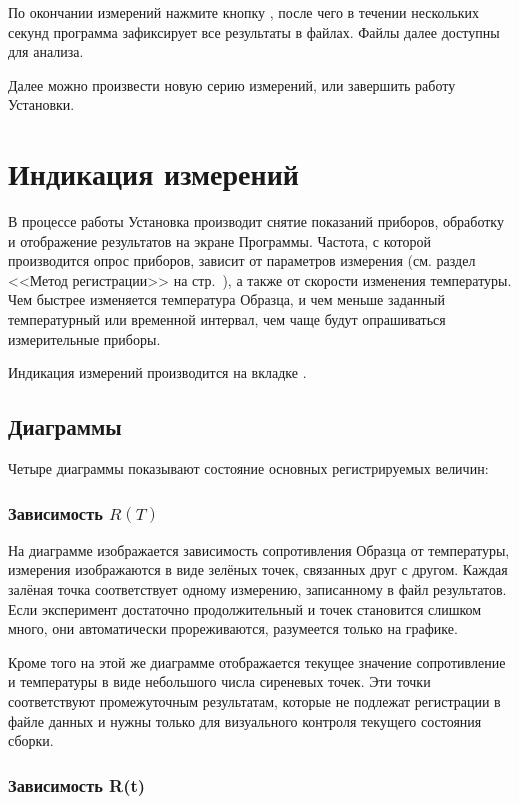 \documentclass[12pt, a4paper, twocolumn]{report}
\begin{document}
По окончании измерений нажмите кнопку , после чего в течении нескольких секунд программа зафиксирует все результаты в файлах. Файлы далее доступны для анализа.

Далее можно произвести новую серию измерений, или завершить работу Установки.

\section{Индикация измерений}

В процессе работы Установка производит снятие показаний приборов, обработку и отображение результатов на экране Программы. Частота, с которой производится опрос приборов, зависит от параметров измерения (см. раздел <<Метод регистрации>> на стр.~\pageref{sec_reg_method}), а также от скорости изменения температуры. Чем быстрее изменяется температура Образца, и чем меньше заданный температурный или временной интервал, чем чаще будут опрашиваться измерительные приборы.

Индикация измерений производится на вкладке .

\subsection{Диаграммы}

Четыре диаграммы показывают состояние основных регистрируемых величин:

\subsubsection{Зависимость $R(T)$}

На диаграмме изображается зависимость сопротивления Образца от температуры, измерения изображаются в виде зелёных точек, связанных друг с другом. Каждая залёная точка соответствует одному измерению, записанному в файл результатов. Если эксперимент достаточно продолжительный и точек становится слишком много, они автоматически прореживаются, разумеется только на графике.

Кроме того на этой же диаграмме отображается текущее значение сопротивление и температуры в виде небольшого числа сиреневых точек. Эти точки соответствуют промежуточным результатам, которые не подлежат регистрации в файле данных и нужны только для визуального контроля текущего состояния сборки.

\subsubsection{Зависимость R(t)}
\end{document}
